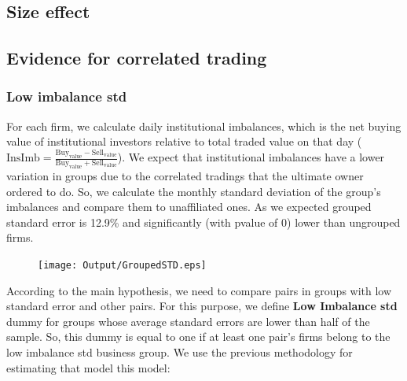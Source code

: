 \documentclass[12pt, a4paper]{article}
\begin{document}
\FloatBarrier




\subsection{Size effect}




	\begin{table}[htbp]
	\centering
	\resizebox{1\textwidth}{!}{
		
	}
\end{table}







\subsection{Evidence for correlated trading }

 \subsubsection{Low imbalance std}
For each firm, we calculate daily institutional imbalances, which is the net buying value of institutional investors relative to total traded value on that day ($ \text{InsImb} = \frac{\text{Buy}_{\text{value}} - \text{Sell}_{\text{value}}}{\text{Buy}_{\text{value}} + \text{Sell}_{\text{value}}} $). 
We expect that institutional imbalances have a lower variation in groups due to the correlated tradings that the ultimate owner ordered to do. So, we calculate the monthly standard deviation of the group's imbalances and compare them to unaffiliated ones. As we expected grouped standard error is  12.9\% and significantly (with pvalue of 0) lower than ungrouped firms. 

\begin{table}[htbp]
	\centering
	\resizebox{0.75\textwidth}{!}{
		
	}
	\label{tab:ImbalanceSummary}%
\end{table}%
\begin{figure}[htbp]
	\centering
	\texttt{[image: Output/GroupedSTD.eps]}
	\label{fig:GroupedSTD}
\end{figure}

According to the main hypothesis, we need to compare pairs in groups with low standard error and other pairs.
For this purpose, we define \textbf{Low Imbalance std} dummy for groups whose average standard errors are lower than half of the sample. 
So, this dummy is equal to one if at least one pair's firms belong to the low imbalance std business group.  We use the previous methodology for estimating that model this model:

\end{document}
